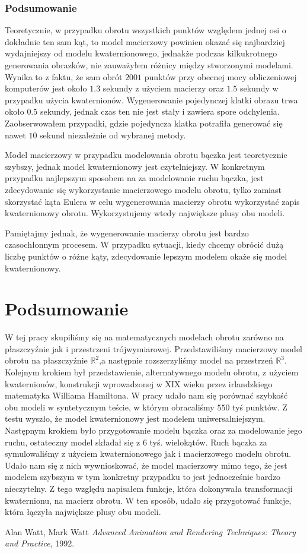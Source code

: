 \documentclass[a4paper,twoside,11pt,reqno]{mwrep}
\theoremstyle{plain} \newtheorem{twr}{Twierdzenie}
\theoremstyle{plain} \newtheorem{lem}{Lemat}
\theoremstyle{definition} \newtheorem{defi}{Definicja}
\theoremstyle{remark} \newtheorem*{wni}{Wniosek}
\theoremstyle{definition} \newtheorem{uwaga}{Uwaga}
\theoremstyle{definition}\newtheorem{prz}{Przykład}
\begin{document}
\subsection*{Podsumowanie}
Teoretycznie, w przypadku obrotu wszystkich punktów względem jednej osi o dokładnie ten sam kąt, to 
model macierzowy powinien okazać się najbardziej wydajniejszy od modelu kwaternionowego, jednakże 
podczas kilkukrotnego generowania obrazków, nie zauważyłem różnicy między stworzonymi modelami.
Wynika to z faktu, że sam obrót $2001$ punktów przy obecnej mocy obliczeniowej komputerów
jest około $1.3$ sekundy z użyciem macierzy oraz $1.5$ sekundy w przypadku użycia kwaternionów.
Wygenerowanie pojedynczej klatki obrazu trwa około $0.5$ sekundy, jednak czas ten nie jest stały i 
zawiera spore odchylenia. Zaobserwowałem przypadki, gdzie pojedyncza klatka potrafiła generować się
nawet $10$ sekund niezależnie od wybranej metody.

Model macierzowy w przypadku modelowania obrotu bączka jest teoretycznie szybszy, jednak model
kwaternionowy jest czytelniejszy. W konkretnym przypadku najlepszym sposobem na 
za modelowanie ruchu bączka, jest zdecydowanie się wykorzystanie macierzowego modelu obrotu,
tylko zamiast skorzystać kąta Eulera w celu wygenerowania macierzy obrotu wykorzystać 
zapis kwaternionowy obrotu. Wykorzystujemy wtedy największe plusy obu modeli.

Pamiętajmy jednak, że wygenerowanie macierzy obrotu jest bardzo czasochłonnym procesem.
W przypadku sytuacji, kiedy chcemy obrócić dużą liczbę punktów o różne kąty, zdecydowanie lepszym modelem okaże się model kwaternionowy.
  
\chapter{Podsumowanie}
W tej pracy skupiliśmy się na matematycznych modelach obrotu zarówno na płaszczyźnie jak i przestrzeni trójwymiarowej. Przedstawiliśmy macierzowy model obrotu na płaszczyźnie $\mathbb{R}^2$,a następnie
rozszerzyliśmy model na przestrzeń $\mathbb{R}^3$. Kolejnym krokiem był przedstawienie, alternatywnego
modelu obrotu, z użyciem kwaternionów, konstrukcji wprowadzonej w XIX wieku przez irlandzkiego matematyka Williama Hamiltona.
W pracy udało nam się porównać szybkość obu modeli w syntetycznym teście, w którym
obracaliśmy $550$ tyś punktów. Z testu wyszło, że model kwaternionowy jest modelem uniwersalniejszym.
Następnym krokiem było przygotowanie modelu bączka oraz za modelowanie jego ruchu, ostateczny model
składał się z $6$ tyś. wielokątów. Ruch bączka za symulowaliśmy z użyciem 
kwaternionowego jak i macierzowego modelu obrotu. Udało nam się z nich wywnioskować, że model
macierzowy mimo tego, że jest modelem szybszym w tym konkretny przypadku to jest jednocześnie bardzo nieczytelny. Z tego względu napisałem funkcje, która dokonywała transformacji kwaternionu, na macierz obrotu. W ten sposób, udało się przygotować funkcje, która łączyła największe plusy obu modeli. 
 
\begin{thebibliography}{9}

\label{1biblio}
    Alan Watt, Mark Watt 
  \emph{Advanced Animation and Rendering Techniques: Theory and Practice},
  1992.

\end{thebibliography}
\end{document}
